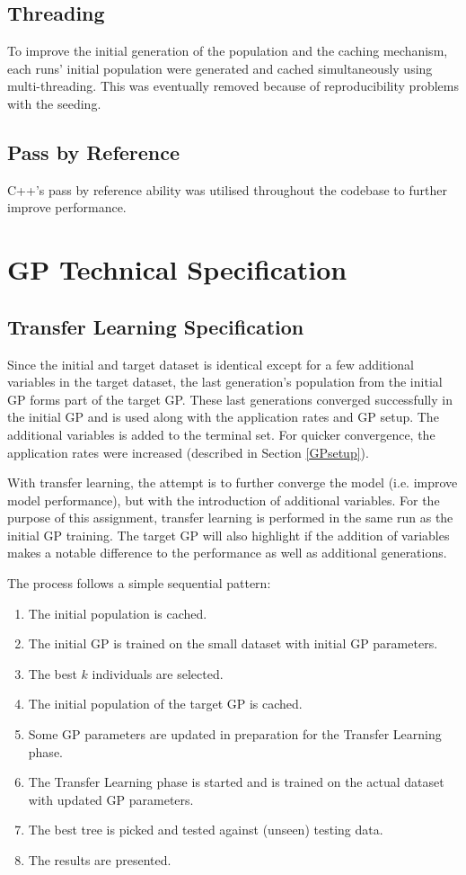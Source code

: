 \documentclass{article}
\begin{document}
\subsection{Threading}
To improve the initial generation of the population and the caching mechanism, each runs' initial population were generated and cached simultaneously using multi-threading. This was eventually removed because of reproducibility problems with the seeding.

\subsection{Pass by Reference}
C++'s pass by reference ability was utilised throughout the codebase to further improve performance.

\section{GP Technical Specification}
\subsection{Transfer Learning Specification}
Since the initial and target dataset is identical except for a few additional variables in the target dataset, the last generation's population from the initial GP forms part of the target GP. These last generations converged successfully in the initial GP and is used along with the application rates and GP setup. The additional variables is added to the terminal set. For quicker convergence, the application rates were increased (described in Section \ref{GPsetup}).

With transfer learning, the attempt is to further converge the model (i.e. improve model performance), but with the introduction of additional variables. For the purpose of this assignment, transfer learning is performed in the same run as the initial GP training. The target GP will also highlight if the addition of variables makes a notable difference to the performance as well as additional generations.

The process follows a simple sequential pattern:
\begin{enumerate}
  \item The initial population is cached.
  \item The initial GP is trained on the small dataset with initial GP parameters.
  \item The best \(k\) individuals are selected.
  \item The initial population of the target GP is cached.
  \item Some GP parameters are updated in preparation for the Transfer Learning phase.
  \item The Transfer Learning phase is started and is trained on the actual dataset with updated GP parameters.
  \item The best tree is picked and tested against (unseen) testing data.
  \item The results are presented.
\end{enumerate}
\end{document}
